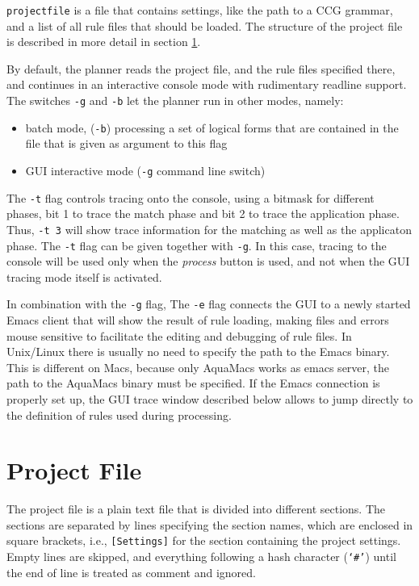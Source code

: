 \documentclass[11pt,a4paper]{article}
\begin{document}
\texttt{projectfile} is a file that contains settings, like the path to a CCG
grammar, and a list of all rule files that should be loaded. The structure of
the project file is described in more detail in section \ref{sec:projectfile}.

By default, the planner reads the project file, and the rule files specified
there, and continues in an interactive console mode with rudimentary readline
support. The switches \texttt{-g} and \texttt{-b} let the planner run in other
modes, namely:

\begin{itemize}
\item batch mode, (\texttt{-b}) processing a set of logical forms that are
  contained in the file that is given as argument to this flag
\item GUI interactive mode (\texttt{-g} command line switch)
\end{itemize}

\noindent{}The \texttt{-t} flag controls tracing onto the console, using a
bitmask for different phases, bit 1 to trace the match phase and bit 2 to trace
the application phase. Thus, \texttt{-t 3} will show trace information for the
matching as well as the applicaton phase. The \texttt{-t} flag can be given
together with \texttt{-g}.  In this case, tracing to the console will be used
only when the \emph{process} button is used, and not when the GUI tracing mode
itself is activated.

In combination with the \texttt{-g} flag, The \texttt{-e} flag connects the GUI
to a newly started Emacs client that will show the result of rule loading,
making files and errors mouse sensitive to facilitate the editing and debugging
of rule files. In Unix/Linux there is usually no need to specify the path to
the Emacs binary. This is different on Macs, because only AquaMacs works as
emacs server, the path to the AquaMacs binary must be specified. If the Emacs
connection is properly set up, the GUI trace window described below allows to
jump directly to the definition of rules used during processing.

\section{Project File}
\label{sec:projectfile}

The project file is a plain text file that is divided into different sections.
The sections are separated by lines specifying the section names, which are
enclosed in square brackets, i.e., \texttt{[Settings]} for the section
containing the project settings. Empty lines are skipped, and everything
following a hash character (\texttt{`\#'}) until the end of line is treated as
comment and ignored.
\end{document}
